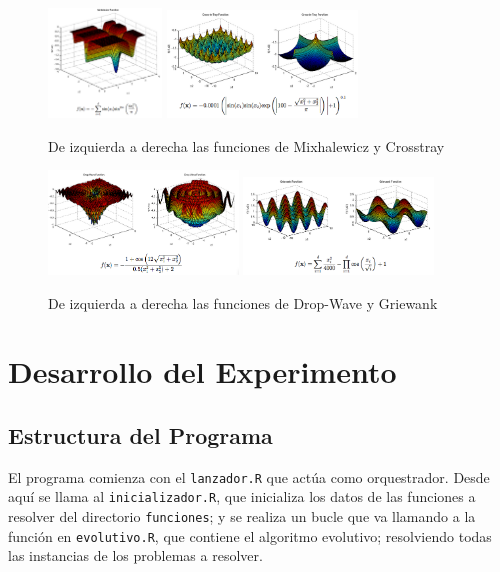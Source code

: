 \documentclass{article}
\begin{document}
\begin{figure}[ht]
\centering
\includegraphics[width=0.27\textwidth]{../imagenes/mixhalewicz}
\includegraphics[width=0.45\textwidth]{../imagenes/crosstray}
\caption{De izquierda a derecha las funciones de Mixhalewicz y Crosstray}
\end{figure}
\begin{figure}[ht]
\centering
\includegraphics[width=0.45\textwidth]{../imagenes/dropwave}
\includegraphics[width=0.45\textwidth]{../imagenes/griewank}
\caption{De izquierda a derecha las funciones de Drop-Wave y Griewank}
\end{figure}

\newpage

\section{Desarrollo del Experimento}

\subsection{Estructura del Programa}
El programa comienza con el \texttt{lanzador.R} que actúa como orquestrador. Desde aquí se llama al \texttt{inicializador.R}, que inicializa los datos de las funciones a resolver del directorio \texttt{funciones}; y se realiza un bucle que va llamando a la función en \texttt{evolutivo.R}, que contiene el algoritmo evolutivo; resolviendo todas las instancias de los problemas a resolver.
\end{document}

